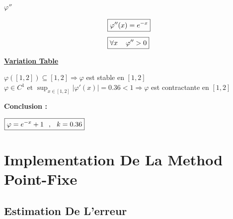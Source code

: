 \vspace{0.5cm}
\textbf{\underline{\(\varphi''\)}}
\begin{center}
    \begin{align*}
        &\boxed{\varphi''(x) =  e^{-x} }\\[0.15cm]
        &\boxed{\forall x \hspace{0.4cm} \varphi'' > 0}
    \end{align*}
\end{center}

\vspace{1cm}
\textbf{\underline{Variation Table}}

\begin{center}
\end{center}
\vspace{0.75cm}


\(\varphi([1,2]) \subseteq [1,2] \Longrightarrow \varphi\) est stable en \([1,2]\)\\[0.2cm]
\(\varphi \in C^{1} \text{  et } \displaystyle\sup_{x \in [1, 2]} |\varphi'(x)| = 0.36 < 1 \Longrightarrow \varphi\) est contractante en \([1,2]\)


\vspace{1.25cm}
\textbf{Conclusion :}
\vspace{-0.25cm}
\begin{center}
    \(\boxed{\varphi = e^{-x} + 1 \hspace{0.25cm},\hspace{0.25cm} k = 0.36}\)
\end{center}

\newpage
\section{Implementation De La Method Point-Fixe}
\subsection{Estimation De L'erreur}


\vspace{0.5cm}

